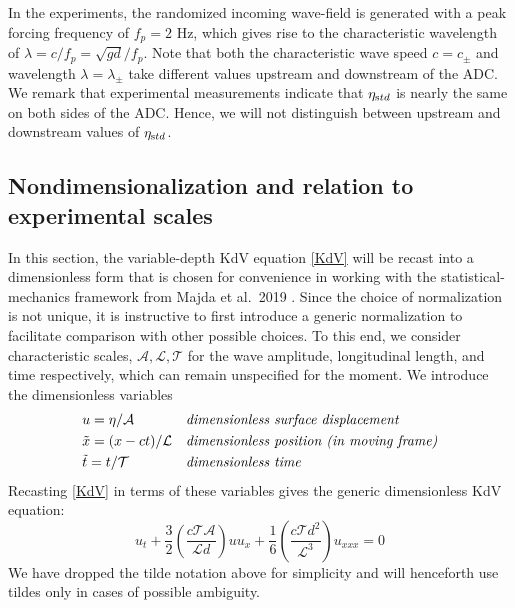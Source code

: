 \documentclass[11pt]{article}
\newcommand{\freqp}{f_p}
\newcommand{\etastd}{\eta_{\text std}}
\newcommand{\depth}{d}
\newcommand{\lam}{\lambda}
\newcommand{\lamupdn}{\lam_{\pm}}
\newcommand{\ampscale}{\mathcal{A}}
\newcommand{\lengthscale}{\mathcal{L}}
\newcommand{\timescale}{\mathcal{T}}
\begin{document}
In the experiments, the randomized incoming wave-field is generated with a peak forcing frequency of $\freqp = 2$ Hz, which gives rise to the characteristic wavelength of $\lam = c/\freqp = \sqrt{g \depth} / \freqp$. Note that both the characteristic wave speed $c = c_{\pm}$ and wavelength $\lam = \lamupdn$ take different values upstream and downstream of the ADC. We remark that experimental measurements indicate that $\etastd$ is nearly the same on both sides of the ADC. Hence, we will not distinguish between upstream and downstream values of $\etastd$.

 
\subsection{Nondimensionalization and relation to experimental scales}

In this section, the variable-depth KdV equation \eqref{KdV} will be recast into a dimensionless form that is chosen for convenience in working with the statistical-mechanics framework from Majda et al.~2019 \cite{majda2019}. Since the choice of normalization is not unique, it is instructive to first introduce a generic normalization to facilitate comparison with other possible choices. To this end, we consider characteristic scales, $\ampscale, \lengthscale, \timescale$ for the wave amplitude, longitudinal length, and time respectively, which can remain unspecified for the moment. We introduce the dimensionless variables
\begin{align}
&u = \eta / \ampscale
&&\mbox{\em dimensionless surface displacement} \\
&\tilde{x} = (x-ct) / \lengthscale
&&\mbox{\em dimensionless position (in moving frame)} \\
&\tilde{t} = t / \timescale
&&\mbox{\em dimensionless time}
\end{align}
Recasting \eqref{KdV} in terms of these variables gives the generic dimensionless KdV equation:
\begin{equation}
u_t + \frac{3}{2} \left( \frac{c \timescale \ampscale}{\lengthscale \depth} \right) u u_x 
+ \frac{1}{6} \left( \frac{c \timescale \depth^2}{\lengthscale^3} \right) u_{xxx} = 0
\end{equation}
We have dropped the tilde notation above for simplicity and will henceforth use tildes only in cases of possible ambiguity.
\end{document}
